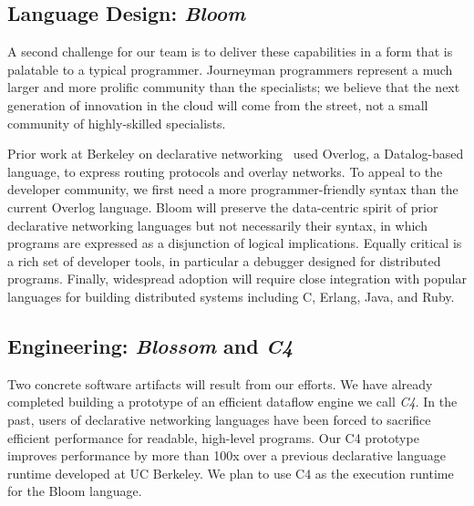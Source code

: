 \subsection{Language Design: \emph{Bloom}}
A second challenge for our team is to deliver these capabilities in a form that
is palatable to a typical programmer.  Journeyman programmers represent a much
larger and more prolific community than the specialists; we believe that the
next generation of innovation in the cloud will come from the street, not a
small community of highly-skilled specialists.

Prior work at Berkeley on declarative networking~\cite{loo-sigmod06, loo-sosp05,
  loo-sigcomm05} used Overlog, a Datalog-based language, to express routing
protocols and overlay networks.  To appeal to the developer community, we first
need a more programmer-friendly syntax than the current Overlog language.  Bloom
will preserve the data-centric spirit of prior declarative networking languages
but not necessarily their syntax, in which programs are expressed as a
disjunction of logical implications.  Equally critical is a rich set of
developer tools, in particular a debugger designed for distributed programs.
Finally, widespread adoption will require close integration with popular
languages for building distributed systems including C, Erlang, Java, and Ruby.

\subsection{Engineering: \emph{Blossom} and \emph{C4}}
Two concrete software artifacts will result from our efforts. 
We have already completed building a prototype of an efficient dataflow
engine we call \emph{C4}. In the past, users of declarative networking
languages have been forced to sacrifice efficient performance for
readable, high-level programs. 
Our C4 prototype improves performance by more than
100x over a previous declarative language runtime developed at UC
Berkeley. We plan to use C4 as the execution runtime for the Bloom
language. 

